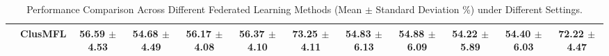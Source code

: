 \begin{table*}[t]
{\begin{tabular}{cccccccccccc}
                          & ClusMFL                    & \textbf{56.59 $\pm$ 4.53} & \textbf{54.68 $\pm$ 4.49} & \textbf{56.17 $\pm$ 4.08} & \textbf{56.37 $\pm$ 4.10} & \textbf{73.25 $\pm$ 4.11} & \textbf{54.83 $\pm$ 6.13} & \textbf{54.88 $\pm$ 6.09} & \textbf{54.22 $\pm$ 5.89} & \textbf{54.40 $\pm$ 6.03} & \textbf{72.22 $\pm$ 4.47} \\ \hline
\end{tabular}
}
\caption{Performance Comparison Across Different Federated Learning Methods (Mean $\pm$ Standard Deviation \%) under Different Settings.}
\label{main result}
\end{table*}
